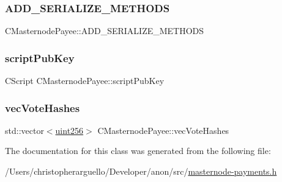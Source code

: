 \subsubsection{\texorpdfstring{A\+D\+D\+\_\+\+S\+E\+R\+I\+A\+L\+I\+Z\+E\+\_\+\+M\+E\+T\+H\+O\+DS}{ADD\_SERIALIZE\_METHODS}}
{\footnotesize\ttfamily C\+Masternode\+Payee\+::\+A\+D\+D\+\_\+\+S\+E\+R\+I\+A\+L\+I\+Z\+E\+\_\+\+M\+E\+T\+H\+O\+DS}

\mbox{\label{class_c_masternode_payee_ab7f8d7f7108b556c92edd00ddd190e63}} 
\subsubsection{\texorpdfstring{script\+Pub\+Key}{scriptPubKey}}
{\footnotesize\ttfamily C\+Script C\+Masternode\+Payee\+::script\+Pub\+Key\hspace{0.3cm}{\ttfamily [private]}}

\mbox{\label{class_c_masternode_payee_a1c2d5658d7f9d0e80421d674a89427fc}} 
\subsubsection{\texorpdfstring{vec\+Vote\+Hashes}{vecVoteHashes}}
{\footnotesize\ttfamily std\+::vector$<$\mbox{\hyperlink{classuint256}{uint256}}$>$ C\+Masternode\+Payee\+::vec\+Vote\+Hashes\hspace{0.3cm}{\ttfamily [private]}}



The documentation for this class was generated from the following file\+:\begin{DoxyCompactItemize}
\item 
/\+Users/christopherarguello/\+Developer/anon/src/\mbox{\hyperlink{masternode-payments_8h}{masternode-\/payments.\+h}}\end{DoxyCompactItemize}
